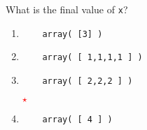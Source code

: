 \documentclass[12pt]{article}
\newcommand{\correctstar}{{\Large\textcolor{red}{$\star$}}}
\begin{document}
  What is the final value of \texttt{x}?
  
  \begin{enumerate}[label=\Alph*]
  	\item
  	\begin{Verbatim}
  	array( [3] )
  	\end{Verbatim}
  	\item
  	\begin{Verbatim}
  	array( [ 1,1,1,1 ] )
  	\end{Verbatim}
  	\item
  	\begin{Verbatim}
  	array( [ 2,2,2 ] )
  	\end{Verbatim}
  	\correctstar
  	\item
  	\begin{Verbatim}
  	array( [ 4 ] )
  	\end{Verbatim}
  \end{enumerate}
\end{document}
